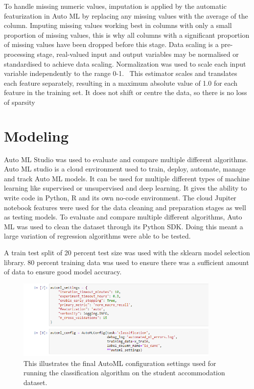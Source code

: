 To handle missing numeric values, imputation is applied by the automatic featurization in Auto ML by replacing any missing values with the average of the column. Imputing missing values working best in columns with only a small proportion of missing values, this is why all columns with a significant proportion of missing values have been dropped before this stage. Data scaling is a pre-processing stage, real-valued input and output variables may be normalised or standardised to achieve data scaling. Normalization was used to scale each input variable independently to the range 0-1.  This estimator scales and translates each feature separately, resulting in a maximum absolute value of 1.0 for each feature in the training set. It does not shift or centre the data, so there is no loss of sparsity \cite{Singh2019MLlib:Library,Sklearn.preprocessing.MaxAbsScalerDocumentation}

\section{Modeling}

Auto ML Studio was used to evaluate and compare multiple different algorithms. Auto ML studio is a cloud environment used to train, deploy, automate, manage and track Auto ML models. It can be used for multiple different types of machine learning like supervised or unsupervised and deep learning. It gives the ability to write code in Python, R and its own no-code environment.  The cloud Jupiter notebook features were used for the data cleaning and preparation stages as well as testing models. To evaluate and compare multiple different algorithms, Auto ML was used to clean the dataset through its Python SDK. Doing this meant a large variation of regression algorithms were able to be tested.

\vspace{5mm}

A train test split of 20 percent test size  was used with the sklearn model selection library. 80 percent training data was used to ensure there was a sufficient amount of data to ensure good model accuracy. 

\begin{figure}[H]
 \centering
 \includegraphics[width=10cm]{figures/auto_ml_settings.png}
 \caption{This illustrates the final AutoML configuration settings used for running the classification algorithm on the student accommodation dataset.}
\end{figure}

